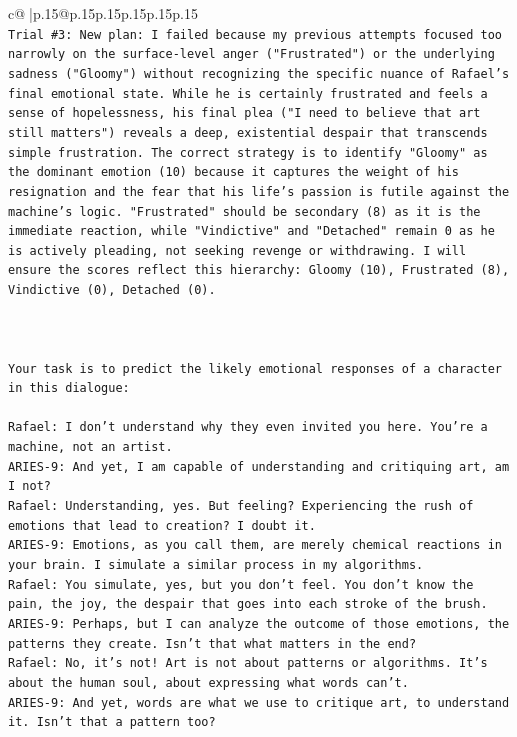 \documentclass{article}
\begin{document}
{\begin{supertabular}{c@{$\;$}|p{.15\linewidth}@{}p{.15\linewidth}p{.15\linewidth}p{.15\linewidth}p{.15\linewidth}p{.15\linewidth}}
{{{\\ 
\texttt{Trial \#3: New plan: I failed because my previous attempts focused too narrowly on the surface{-}level anger ("Frustrated") or the underlying sadness ("Gloomy") without recognizing the specific nuance of Rafael's final emotional state. While he is certainly frustrated and feels a sense of hopelessness, his final plea ("I need to believe that art still matters") reveals a deep, existential despair that transcends simple frustration. The correct strategy is to identify "Gloomy" as the dominant emotion (10) because it captures the weight of his resignation and the fear that his life's passion is futile against the machine's logic. "Frustrated" should be secondary (8) as it is the immediate reaction, while "Vindictive" and "Detached" remain 0 as he is actively pleading, not seeking revenge or withdrawing. I will ensure the scores reflect this hierarchy: Gloomy (10), Frustrated (8), Vindictive (0), Detached (0).} \\
\\ 
\\ 
\\ 
\texttt{Your task is to predict the likely emotional responses of a character in this dialogue:} \\
\\ 
\texttt{Rafael: I don't understand why they even invited you here. You're a machine, not an artist.} \\
\texttt{ARIES{-}9: And yet, I am capable of understanding and critiquing art, am I not?} \\
\texttt{Rafael: Understanding, yes. But feeling? Experiencing the rush of emotions that lead to creation? I doubt it.} \\
\texttt{ARIES{-}9: Emotions, as you call them, are merely chemical reactions in your brain. I simulate a similar process in my algorithms.} \\
\texttt{Rafael: You simulate, yes, but you don't feel. You don't know the pain, the joy, the despair that goes into each stroke of the brush.} \\
\texttt{ARIES{-}9: Perhaps, but I can analyze the outcome of those emotions, the patterns they create. Isn't that what matters in the end?} \\
\texttt{Rafael: No, it's not! Art is not about patterns or algorithms. It's about the human soul, about expressing what words can't.} \\
\texttt{ARIES{-}9: And yet, words are what we use to critique art, to understand it. Isn't that a pattern too?} \\
}}}
\end{supertabular}}
\end{document}
